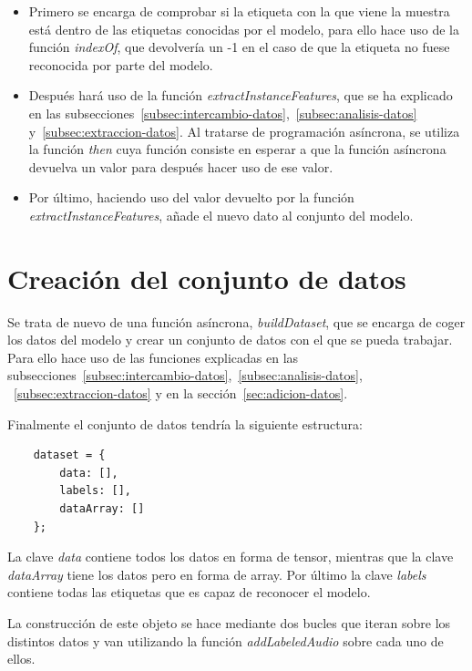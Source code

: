 \documentclass[a4paper, 12pt]{book}
\begin{document}
\begin{itemize}
	\item Primero se encarga de comprobar si la etiqueta con la que viene la muestra está dentro de las etiquetas conocidas por el modelo, para ello hace uso de la función \textit{indexOf}, que devolvería un -1 en el caso de que la etiqueta no fuese reconocida por parte del modelo.
	\item Después hará uso de la función \textit{extractInstanceFeatures}, que se ha explicado en las subsecciones~\ref{subsec:intercambio-datos},~\ref{subsec:analisis-datos} y~\ref{subsec:extraccion-datos}. Al tratarse de programación asíncrona, se utiliza la función \textit{then} cuya función consiste en esperar a que la función asíncrona devuelva un valor para después hacer uso de ese valor.
	\item Por último, haciendo uso del valor devuelto por la función \textit{extractInstanceFeatures}, añade el nuevo dato al conjunto del modelo.
\end{itemize}

\section{Creación del conjunto de datos}
\label{sec:creacion-dataset}

Se trata de nuevo de una función asíncrona, \textit{buildDataset}, que se encarga de coger los datos del modelo y crear un conjunto de datos con el que se pueda trabajar. Para ello hace uso de las funciones explicadas en las subsecciones~\ref{subsec:intercambio-datos},~\ref{subsec:analisis-datos}, ~\ref{subsec:extraccion-datos} y en la sección~\ref{sec:adicion-datos}.

Finalmente el conjunto de datos tendría la siguiente estructura:

\begin{verbatim}
	dataset = {
    	data: [],
    	labels: [],
    	dataArray: []
  	};
\end{verbatim}

La clave \textit{data} contiene todos los datos en forma de tensor, mientras que la clave \textit{dataArray} tiene los datos pero en forma de array. Por último la clave \textit{labels} contiene todas las etiquetas que es capaz de reconocer el modelo.

La construcción de este objeto se hace mediante dos bucles que iteran sobre los distintos datos y van utilizando la función \textit{addLabeledAudio} sobre cada uno de ellos.
\end{document}
